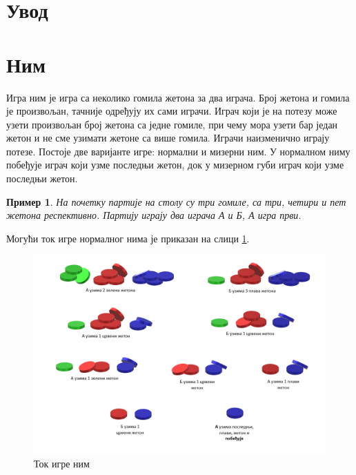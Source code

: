 \documentclass[a4paper]{article}
\newtheorem{example}{Пример}
\begin{document}

\newpage
{}
\tableofcontents

\newpage
{}
\section{Увод}
\label{sec:uvod}

\section{Ним}
\label{sec:nim}

Игра ним је игра са неколико гомила жетона за два играча. Број жетона и гомила је произвољан, тачније одређују их сами играчи. Играч који је на потезу може узети произвољан број жетона са једне гомиле, при чему мора узети бар један жетон и не сме узимати жетоне са више гомила. Играчи наизменично играју потезе. Постоје две варијанте игре: нормални и мизерни ним. У нормалном ниму побеђује играч који узме последњи жетон, док у мизерном губи играч који узме последњи жетон.

\begin{example}
На почетку партије на столу су три гомиле, са три, четири и пет жетона респективно. Партију играју два играча \textit{А} и \textit{Б}, \textit{А} игра први. 
\end{example}

Могући ток игре нормалног нима је приказан на слици \ref{fig:nimPrimer}.

\begin{figure}[H]
	\caption{Ток игре ним}
	\label{fig:nimPrimer}
	\begin{center}
		\includegraphics[width=\textwidth]{NimPrimer.png}
	\end{center}
\end{figure}
\end{document}
